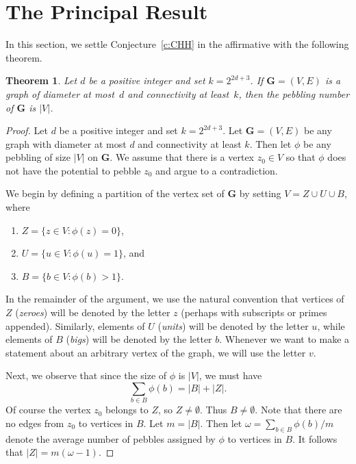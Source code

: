 \documentclass{amsart}
\newtheorem{theorem}{Theorem}[section]
\theoremstyle{remark}
\newcommand{\GVE}{\mathbf{G}=(V,E)}
\newcommand{\bfG}{\mathbf{G}}
\begin{document}
\section{The Principal Result}\label{s:proof}
In this section, we settle Conjecture~\ref{c:CHH} in the affirmative 
with the following theorem.
\begin{theorem}\label{t:main}
Let $d$ be a positive integer and set $k=2^{2d+3}$.
If $\GVE$ is a graph of
diameter at most~$d$ and connectivity at least~$k$,
then the pebbling number of $\bfG$ is $|V|$.
\end{theorem}
\begin{proof}
Let $d$ be a positive integer and set $k=2^{2d+3}$. 
Let $\GVE$ be any graph with diameter at most $d$ and 
connectivity at least $k$.  Then let $\phi$ be any pebbling of 
size $|V|$ on $\bfG$.  We assume that there is a
vertex $z_0\in V$ so that $\phi$ does not have the
potential to pebble $z_0$ and argue to a contradiction.

We begin by defining a partition of the vertex set of $\bfG$ by
setting $V=Z\cup U\cup B$, where 
\begin{enumerate}
\item $Z=\{z\in V:\phi(z)=0\}$,
\item $U=\{u\in V:\phi(u)=1\}$, and
\item $B=\{b\in V:\phi(b)>1\}$.
\end{enumerate}
In the remainder of the argument, we use the natural convention
that vertices of $Z$ (\textit{zeroes}) will be denoted by
the letter $z$ (perhaps with subscripts or primes appended).
Similarly, elements of $U$ (\textit{units})
will be denoted by the letter $u$, while elements of $B$ 
(\textit{bigs}) will be denoted by the letter $b$.  Whenever
we want to make a statement about an arbitrary vertex of the
graph, we will use the letter $v$.

Next, we observe that since
the size of $\phi$ is $|V|$, we must have
\[
\sum_{b\in B}\phi(b)=|B|+|Z|.
\]
Of course the vertex $z_0$ belongs to $Z$, so $Z\neq\emptyset$.
Thus $B\neq\emptyset$.  Note that there are no edges from
$z_0$ to vertices in $B$.   Let $m=|B|$.  Then let $\omega=
\sum_{b\in B}\phi(b)/m$ denote the average number of pebbles
assigned by $\phi$ to vertices in $B$.  
It follows that $|Z|=m(\omega - 1)$.  


\end{proof}
\end{document}
